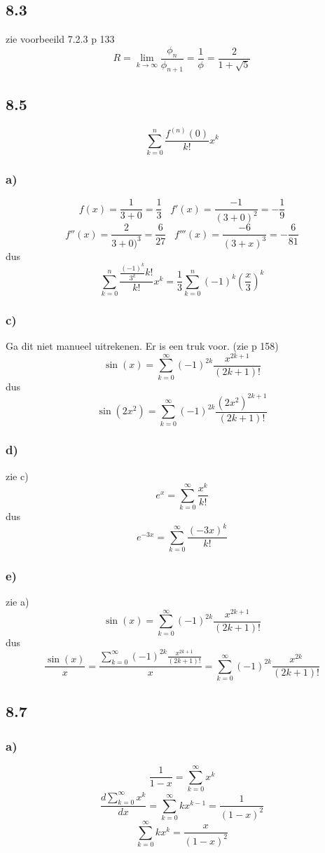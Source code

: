 \documentclass[11pt]{article}
\begin{document}
\subsection*{8.3}
zie voorbeeild 7.2.3 p 133
\[
R=\lim_{k\rightarrow\infty}\frac{\phi_n}{\phi_{n+1}} = \frac{1}{\phi} = \frac{2}{1+\sqrt{5}}
\]

\subsection*{8.5}
\[
\sum_{k=0}^n\frac{f^{(n)}(0)}{k!}x^k
\]
\[
\]

\subsubsection*{a)}
\[
f(x) = \frac{1}{3+0}= \frac{1}{3} \;\;\; f'(x) = \frac{-1}{(3+0)^2}=-\frac{1}{9}
\]
\[
f''(x) = \frac{2}{3+0)^3}=\frac{6}{27} \;\;\; f'''(x) =\frac{-6}{(3+x)^3} = -\frac{6}{81}
\]
dus
\[
\sum_{k=0}^n\frac{\frac{(-1)^k}{3^k}k!}{k!}x^k
=\frac{1}{3}\sum_{k=0}^n(-1)^k\left(\frac{x}{3}\right)^k 
\]

\subsubsection*{c)}
Ga dit niet manueel uitrekenen. Er is een truk voor.
(zie p 158)
\[
\sin(x) = \sum_{k=0}^\infty(-1)^{2k}\frac{x^{2k+1}}{(2k+1)!}
\]
dus
\[
\sin(2x^2) = \sum_{k=0}^\infty(-1)^{2k}\frac{(2x^2)^{2k+1}}{(2k+1)!}
\]

\subsubsection*{d)}
zie c)
\[
e^x = \sum_{k=0}^\infty\frac{x^k}{k!}
\]
dus
\[
e^{-3x} = \sum_{k=0}^\infty\frac{(-3x)^k}{k!}
\]

\subsubsection*{e)}
zie a)
\[
\sin(x) = \sum_{k=0}^\infty(-1)^{2k}\frac{x^{2k+1}}{(2k+1)!}
\]
dus
\[
\frac{\sin(x)}{x} = \frac{\sum_{k=0}^\infty(-1)^{2k}\frac{x^{2k+1}}{(2k+1)!}}{x}
=
\sum_{k=0}^\infty(-1)^{2k}\frac{x^{2k}}{(2k+1)!}
\]

\subsection*{8.7}
\subsubsection*{a)}
\[
\frac{1}{1-x} = \sum_{k=0}^\infty x^k
\]
\[
\frac{d\sum_{k=0}^\infty x^k}{dx} = \sum_{k=0}^\infty kx^{k-1}
= \frac{1}{(1-x)^2}
\]
\[
\sum_{k=0}^\infty kx^{k} = \frac{x}{(1-x)^2} 
\]
\end{document}
